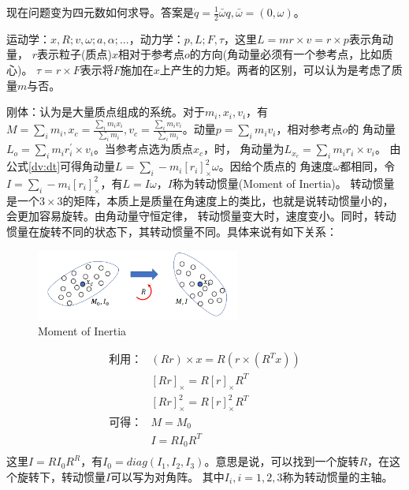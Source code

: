 \documentclass[lang=cn,newtx,10pt,scheme=chinese]{elegantbook}
\begin{document}
现在问题变为四元数如何求导。答案是$\dot{q}=\frac{1}{2}\bar{\omega}q,\bar{\omega}=(0, \omega)$。

运动学：$x, R; v, \omega; a, \alpha; ...$，动力学：$p, L; F, \tau$，这里$L=mr\times v=r \times p$表示角动量，
$r$表示粒子(质点)$x$相对于参考点$o$的方向(角动量必须有一个参考点，比如质心)。
$\tau=r\times F$表示将$F$施加在$x$上产生的力矩。两者的区别，可以认为是考虑了质量$m$与否。

刚体：认为是大量质点组成的系统。对于$m_i, x_i, v_i$，有$M=\sum_i m_i, x_c=\frac{\sum_i m_i x_i}{\sum_i m_i},
v_c=\frac{\sum_i m_i v_i}{\sum_i m_i}$。动量$p=\sum_i m_i v_i$，相对参考点$o$的
角动量$L_o = \sum_i m_i r^{\prime}_i \times v_i$。当参考点选为质点$x_c$，时，
角动量为$L_{x_c}=\sum_i m_i r_i \times v_i$。
由公式\ref{dv:dt}可得角动量$L=\sum_i -m_i [r_i]_{\times}^2\omega$。因给个质点的
角速度$\omega$都相同，令$I=\sum_i -m_i [r_i]_{\times}^2$，有$L=I \omega$，$I$称为转动惯量(Moment of Inertia)。
转动惯量是一个$3\times 3$的矩阵，本质上是质量在角速度上的类比，也就是说转动惯量小的，会更加容易旋转。由角动量守恒定律，
转动惯量变大时，速度变小。同时，转动惯量在旋转不同的状态下，其转动惯量不同。具体来说有如下关系：
\begin{figure}[htbp]
  \centering
  \includegraphics[width=0.6\textwidth]{./image/MomentofInertia.png}
  \caption{Moment of Inertia \label{fig:MomentofInertia}}
\end{figure}

\begin{equation}
  \begin{aligned}
  \text{利用：}
  & (R r) \times x=R\left(r \times\left(R^T x\right)\right) \\
  & {[R r]_{\times}=R[r]_{\times} R^T} \\
  & {[R r]_{\times}^2=R[r]_{\times}^2 R^T} \\
  \text{可得：}
  & M=M_0 \\
  & I=R I_0 R^T \\
  &
  \end{aligned}
\end{equation}
这里$I=RI_0 R^R$，有$I_0=diag(I_1, I_2, I_3)$。意思是说，可以找到一个旋转$R$，在这个旋转下，转动惯量$I$可以写为对角阵。
其中$I_i, i=1, 2, 3$称为转动惯量的主轴。
\end{document}
